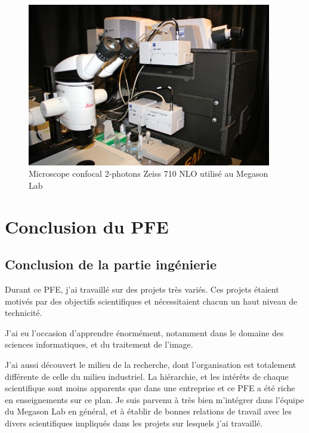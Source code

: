 \begin{figure}[htb]
\begin{center}
\leavevmode
\includegraphics[width=0.95\textwidth]{pictures/PICmicroscope}
\end{center}
\caption{Microscope confocal 2-photons Zeiss 710 NLO utilisé au Megason Lab}
\label{fig:MicMegason}
\end{figure}

\clearpage





%




\chapter{Conclusion du PFE}


\section{Conclusion de la partie ingénierie}

Durant ce PFE, j'ai travaillé sur des projets très variés.
Ces projets étaient motivés par des objectifs scientifiques et nécessitaient chacun un haut niveau de technicité.

J'ai eu l'occasion d'apprendre énormément,
notamment dans le domaine des sciences informatiques,
et du traitement de l'image.

J'ai aussi découvert le milieu de la recherche, dont l'organisation est
totalement différente de celle du milieu industriel.
La hiérarchie, et les intérêts de chaque scientifique sont moins apparents que dans une entreprise et ce PFE a été riche en enseignements sur ce plan.
Je suis parvenu à très bien m'intégrer dans l'équipe du Megason Lab en général,
et à établir de bonnes relations de travail avec les divers scientifiques
impliqués dans les projets sur lesquels j'ai travaillé.

